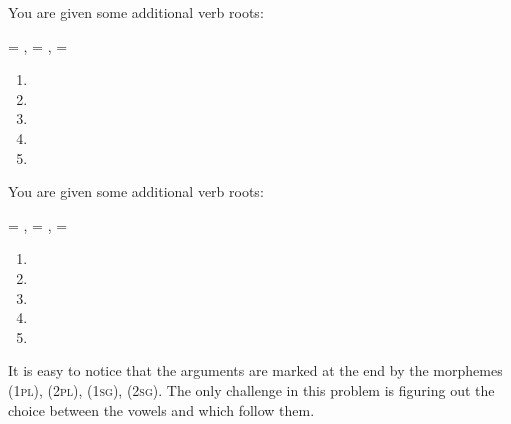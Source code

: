 \begin{refsection}
\begin{problem}{\langnameTabasaran}{\nameYTestelets}{}
\begin{assgts}
\item You are given some additional verb roots:
\begin{center}
     = ,  = ,  = 
\end{center}
\item[] \transinen
\begin{multicols}{3}
\begin{enumerate}
    \item {}
    \item {}
    \item {}
    \item {}
    \item {}
    \blankitem
\end{enumerate}
\end{multicols}
\item You are given some additional verb roots:
\begin{center}
     = ,  = ,  = 
\end{center}
\item[] \transinen[\langnameTabasaran]
\begin{multicols}{2}
\begin{enumerate}[start = 6]
    \item {}
    \item {}
    \item {}
    \item {}
    \item {}
    \blankitem
\end{enumerate}
\end{multicols}
\end{assgts}
\end{problem}

\begin{mysolution}

It is easy to notice that the arguments are marked at the end by the morphemes  (1\textsc{pl}),  (2\textsc{pl}),  (1\textsc{sg}),  (2\textsc{sg}). The only challenge in this problem is figuring out the choice between the vowels  and  which follow them.


\end{mysolution}
\end{refsection}
